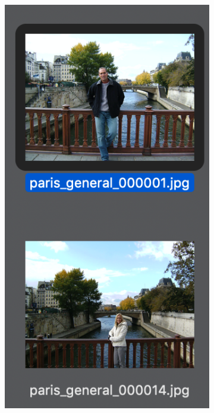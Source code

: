 \documentclass[12pt]{article}
\begin{document}
\begin{figure}[H]
	\centering
	\begin{subfigure}[b]{.3\textwidth}
		\includegraphics[width=.7\textwidth]{images/correct_match_1.png}
	\end{subfigure}%
	~
	\begin{subfigure}[b]{.3\textwidth}

\end{subfigure}
\end{figure}
\end{document}
